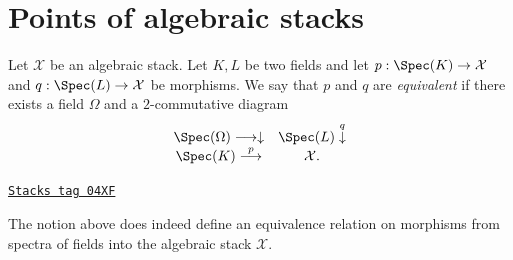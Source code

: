 \section{Points of algebraic stacks}
\label{stacks-properties-section-points}
Let $\mathcal{X}$ be an algebraic stack. Let $K, L$ be two fields
and let $p : \Spec(K) \to \mathcal{X}$ and
$q : \Spec(L) \to \mathcal{X}$ be morphisms.
We say that $p$ and $q$ are {\it equivalent} if there exists a
field $\Omega$ and a $2$-commutative diagram
$$
\begin{array}{cc}\Spec(\Omega) \longrightarrow\downarrow & \Spec(L) \overset{q}{\downarrow} \\ \Spec(K) \overset{p}{\longrightarrow} & \mathcal{X}.\end{array}
$$

\begin{lemma}[Equivalence]
\label{stacks-properties-lemma-equivalence}
\href{https://stacks.math.columbia.edu/tag/04XF}{\texttt{Stacks tag 04XF}}

The notion above does indeed define an equivalence relation on
morphisms from spectra of fields into the algebraic stack $\mathcal{X}$.
\end{lemma}

